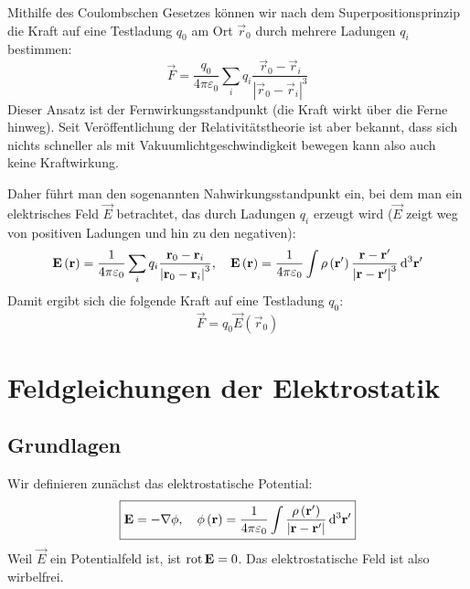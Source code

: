 Mithilfe des Coulombschen Gesetzes können wir nach dem Superpositionsprinzip die Kraft auf eine Testladung $q_{0}$ am Ort $\vec {r}_{0}$ durch mehrere Ladungen $q_{i}$ bestimmen:
\begin{equation}
	\label{3.2}
	\vec {F}=\frac{q_{0}}{4\pi \varepsilon _{0}}\sum _{i}q_{i}\frac{\vec {r}_{0}-\vec {r}_{i}}{\left| \vec {r}_{0}-\vec {r}_{i}\right| ^{3}}
\end{equation}
Dieser Ansatz ist der Fernwirkungsstandpunkt (die Kraft wirkt über die Ferne hinweg). Seit Veröffentlichung der Relativitätstheorie ist aber bekannt, dass sich nichts schneller als mit Vakuumlichtgeschwindigkeit bewegen kann \textendash{} also auch keine Kraftwirkung.

Daher führt man den sogenannten Nahwirkungsstandpunkt ein, bei dem man ein elektrisches Feld $\vec {E}$ betrachtet, das durch Ladungen $q_{i}$ erzeugt wird ($\vec {E}$ zeigt weg von positiven Ladungen und hin zu den negativen):
\begin{equation}
	\vec {E}\left(\vec {r}\right)=\frac{1}{4\pi \varepsilon _{0}}\sum _{i}q_{i}\frac{\vec {r}_{0}-\vec {r}_{i}}{\left| \vec {r}_{0}-\vec {r}_{i}\right| ^{3}},\quad \vec {E}\left(\vec {r}\right)=\frac{1}{4\pi \varepsilon _{0}}\int \rho \left(\vec {r}'\right)\frac{\vec {r}-\vec {r}'}{\left| \vec {r}-\vec {r}'\right| ^{3}}\diffa[3]{\vec{r}'}
\end{equation}
Damit ergibt sich die folgende Kraft auf eine Testladung $q_{0}$:
\begin{equation}
	\vec {F}=q_{0}\vec {E}\left(\vec {r}_{0}\right)
\end{equation}


\section{Feldgleichungen der Elektrostatik}

\subsection{Grundlagen}

Wir definieren zunächst das elektrostatische Potential:
\begin{equation}
	\label{3.3}
	\boxed{\vec {E}=-\nabla \phi ,\quad \phi \left(\vec {r}\right)=\frac{1}{4\pi \varepsilon _{0}}\int \frac{\rho \left(\vec {r}'\right)}{\left| \vec {r}-\vec {r}'\right| }\diffa[3]{\vec{r}'}}
\end{equation}
Weil $\vec {E}$ ein Potentialfeld ist, ist $\rot \vec {E}=0$. Das elektrostatische Feld ist also wirbelfrei.

